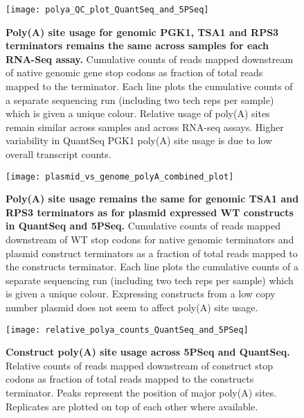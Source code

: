 \documentclass[../main.tex]{subfiles}
\begin{document}
\begin{figure}[h!]

{\centering \texttt{[image: polya\_QC\_plot\_QuantSeq\_and\_5PSeq]} 

}

\caption[Poly(A) site usage for genomic PGK1, TSA1 and RPS3 terminators remains the same across samples for each RNA-Seq assay.]{\textbf{Poly(A) site usage for genomic PGK1, TSA1 and RPS3 terminators remains the same across samples for each RNA-Seq assay.} Cumulative counts of reads mapped downstream of native genomic gene stop codons as fraction of total reads mapped to the terminator. Each line plots the cumulative counts of a separate sequencing run (including two tech reps per sample) which is given a unique colour. Relative usage of poly(A) sites remain similar across samples and across RNA-seq assays. Higher variability in QuantSeq PGK1 poly(A) site usage is due to low overall transcript counts.}\label{fig:rnaseq-QC-QuantSeq-and-5PSeq-genomic-polyA}
\end{figure}

\begin{figure}[h!]

{\centering \texttt{[image: plasmid\_vs\_genome\_polyA\_combined\_plot]} 

}

\caption[Poly(A) site usage remains the same for genomic TSA1 and RPS3 terminators as for plasmid expressed WT constructs in QuantSeq and 5PSeq.]{\textbf{Poly(A) site usage remains the same for genomic TSA1 and RPS3 terminators as for plasmid expressed WT constructs in QuantSeq and 5PSeq.} Cumulative counts of reads mapped downstream of WT stop codons for native genomic terminators and plasmid construct terminators as a fraction of total reads mapped to the constructs terminator. Each line plots the cumulative counts of a separate sequencing run (including two tech reps per sample) which is given a unique colour. Expressing constructs from a low copy number plasmid does not seem to affect poly(A) site usage.}\label{fig:rnaseq-QC-genomic-vs-plasmid-polyA}
\end{figure}

\begin{figure}[h!]

{\centering \texttt{[image: relative\_polya\_counts\_QuantSeq\_and\_5PSeq]} 

}

\caption[Construct poly(A) site usage across 5PSeq and QuantSeq.]{\textbf{Construct poly(A) site usage across 5PSeq and QuantSeq.} Relative counts of reads mapped downstream of construct stop codons as fraction of total reads mapped to the constructs terminator. Peaks represent the position of major poly(A) sites. Replicates are plotted on top of each other where available.}\label{fig:relative-polya-counts}
\end{figure}
\end{document}
